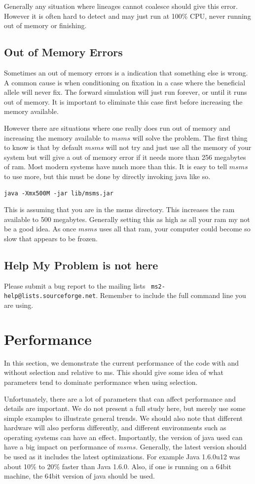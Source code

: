 \documentclass{article}
\begin{document}
Generally any situation where lineages cannot coalesce should give this error.
However it is often hard to detect and may just run at 100\% CPU, never running
out of memory or finishing. 

\subsection{Out of Memory Errors}
Sometimes an out of memory errors is a indication that something else is wrong.
A common cause is when conditioning on fixation in a case where the beneficial
allele will never fix. The forward simulation will just run forever, or until it runs out
of memory. It is important to eliminate this case first before increasing the
memory available. 

However there are situations where one really does run out of memory and
increasing the memory available to $msms$ will solve the problem. The first thing
to know is that by default $msms$ will not try and just use all the memory of
your system but will give a out of memory error if it needs more than 256
megabytes of ram. Most modern systems have much more than this. It is easy to
tell $msms$ to use more, but this must be done by directly invoking java like
so.
\begin{verbatim}
java -Xmx500M -jar lib/msms.jar
\end{verbatim}
This is assuming that you are in the msms directory. This increases the ram
available to 500 megabytes. Generally setting this as high as all your ram my not
be a good idea. As once $msms$ uses all that ram, your computer could become so
slow that appears to be frozen. 

\subsection{Help My Problem is not here}
Please submit a bug report to the mailing lists {\tt
ms2-help@lists.sourceforge.net}. Remember to include the full command line you are
using. 

\section{Performance}

In this section, we demonstrate the current performance of the code with and
without selection and relative to ms. This should give some idea of what
parameters tend to dominate performance when using selection. 

Unfortunately, there are a lot of parameters that can affect performance and
details are important. We do not present a full study here, but merely use some
simple examples to illustrate general trends. We should also note that
different hardware will also perform differently, and different environments
such as operating systems can have an effect. Importantly, the version of java
used can have a big impact on performance of $msms$. Generally, the latest
version should be used as it includes the latest optimizations. For example Java
1.6.0u12 was about 10\% to 20\% faster than Java 1.6.0. Also, if one is running
on a 64bit machine, the 64bit version of java should be used.
\end{document}
